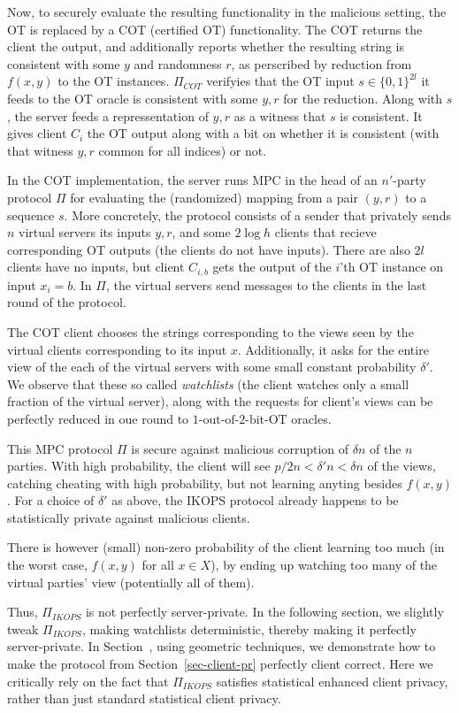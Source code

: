 \documentclass[a4paper]{article}
\newcommand{\OT}[2]{#1\text{-out-of-}#2\text{-bit-OT}}
\begin{document}
Now, to securely evaluate the resulting functionality in the malicious setting, the OT is replaced by a COT (certified OT) functionality. The COT returns the client the output, and additionally reports whether the resulting string is consistent with some $y$ and randomness $r$, as perscribed by reduction from $f(x,y)$ to the OT instances. 
$\Pi_{COT}$ verifyies that the OT input $s\in\{0,1\}^{2l}$ it feeds to the OT oracle is consistent with some $y,r$ for the reduction. 
Along with $s$, the server feeds a repressentation of $y,r$ as a witness that $s$ is consistent.
It gives client $C_i$ 
the OT output along with a bit on whether it is consistent (with that witness $y,r$ common for all indices) or not.

In the COT implementation, the server runs MPC in the head of an $n'$-party protocol $\Pi$ for evaluating the (randomized) mapping from a pair $(y,r)$ to a sequence $s$. More concretely, the protocol consists of a sender that privately sends $n$ virtual servers its inputs $y,r$, and some $2\log{h}$ clients that recieve corresponding OT outputs (the clients do not have inputs). There are also $2l$ clients have no inputs, but client $C_{i,b}$ gets the output of the $i$'th OT instance on input $x_i=b$. 
In $\Pi$, the virtual servers send messages to the clients in the last round of the protocol.

The COT client chooses the strings corresponding to the views seen by the virtual clients corresponding to its input $x$. Additionally, it asks for the entire view of the each of the virtual servers with some small constant probability $\delta'$. We observe that these so called \emph{watchlists} (the client watches only a small fraction of the virtual server), along with the requests for client's views can be perfectly reduced in oue round to $\OT{1}{2}$ oracles.


This MPC protocol $\Pi$ is secure against malicious corruption of $\delta n$ of the $n$ parties. With high probability, the client will see $p/2n < \delta' n<\delta n$ of the views, catching cheating with high probability, but not learning anyting besides $f(x,y)$.  
For a choice of $\delta'$ as above, the IKOPS protocol already happens to be statistically private against malicious clients.

There is however (small) non-zero probability of the client learning too much (in the worst case, $f(x,y)$ for all $x\in X$), by ending up watching too many of the virtual parties' view (potentially all of them). 

Thus, $\Pi_{IKOPS}$ is not perfectly server-private.
In the following section, we slightly tweak $\Pi_{IKOPS}$, making watchlists deterministic, thereby making it perfectly server-private. In Section~\cite{sec-serv-perf}, using geometric techniques, we demonstrate how to make the protocol from Section~\ref{sec-client-pr} perfectly client correct. Here we critically rely on the fact that $\Pi_{IKOPS}$ satisfies statistical enhanced client privacy, rather than just standard statistical client privacy. 
\end{document}
